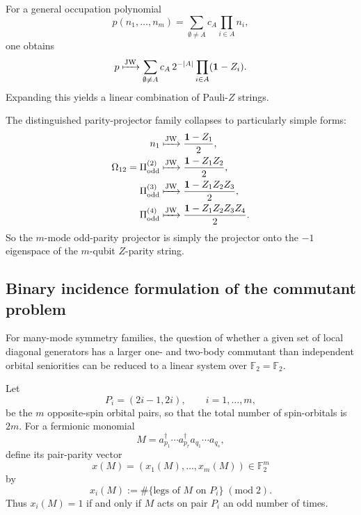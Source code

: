 \documentclass[11pt]{article}
\newcommand{\F}{\mathbb{F}_2}
\newcommand{\I}{\mathbf{1}}
\newcommand{\odd}{\mathrm{odd}}
\newcommand{\JW}{\mathrm{JW}}
\newcommand{\modtwo}{\; (\mathrm{mod}\; 2)}
\theoremstyle{definition}
\theoremstyle{remark}
\begin{document}
For a general occupation polynomial
\begin{equation}
  p(n_1,\dots,n_m)=\sum_{\emptyset\neq A} c_A \prod_{i\in A}n_i,
\end{equation}
one obtains
\begin{equation}
  p \xmapsto{\JW}
  \sum_{\emptyset\neq A} c_A\,2^{-|A|}\prod_{i\in A}(\I-Z_i).
\end{equation}
Expanding this yields a linear combination of Pauli-$Z$ strings.

The distinguished parity-projector family collapses to particularly simple forms:
\begin{align}
  n_1
  &\xmapsto{\JW}
  \frac{\I-Z_1}{2},
  \\
  \Omega_{12}=\Pi^{(2)}_{\odd}
  &\xmapsto{\JW}
  \frac{\I-Z_1Z_2}{2},
  \\
  \Pi^{(3)}_{\odd}
  &\xmapsto{\JW}
  \frac{\I-Z_1Z_2Z_3}{2},
  \\
  \Pi^{(4)}_{\odd}
  &\xmapsto{\JW}
  \frac{\I-Z_1Z_2Z_3Z_4}{2}.
\end{align}
So the $m$-mode odd-parity projector is simply the projector onto the $-1$ eigenspace of the $m$-qubit $Z$-parity string.

\subsection{Binary incidence formulation of the commutant problem}

For many-mode symmetry families, the question of whether a given set of local diagonal generators
has a larger one- and two-body commutant than independent orbital seniorities can be reduced to
a linear system over $\F=\mathbb F_2$.

Let
\begin{equation}
  P_i=(2i-1,2i),
  \qquad
  i=1,\dots,m,
\end{equation}
be the $m$ opposite-spin orbital pairs, so that the total number of spin-orbitals is $2m$.
For a fermionic monomial
\begin{equation}
  M
  =
  a_{p_1}^\dagger\cdots a_{p_r}^\dagger
  a_{q_1}\cdots a_{q_s},
\end{equation}
define its pair-parity vector
\begin{equation}
  x(M)=(x_1(M),\dots,x_m(M))\in \F^m
\end{equation}
by
\begin{equation}
  x_i(M)
  :=
  \#\{\text{legs of }M\text{ on }P_i\}
  \modtwo .
\end{equation}
Thus $x_i(M)=1$ if and only if $M$ acts on pair $P_i$ an odd number of times.
\end{document}
